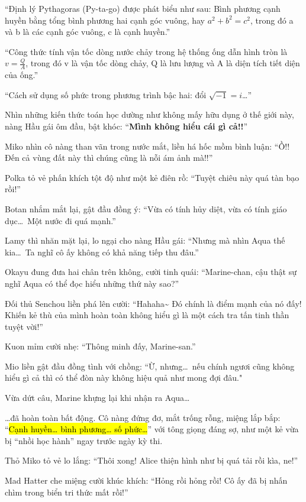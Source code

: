 \documentclass[../main.tex]{subfiles}
\begin{document}
``Định lý Pythagoras (Py-ta-go) được phát biểu như sau: Bình phương cạnh huyền bằng tổng bình phương hai cạnh góc vuông, hay \(a^2 + b^2 = c^2\), trong đó a và b là các cạnh góc vuông, c là cạnh huyền.''

``Công thức tính vận tốc dòng nước chảy trong hệ thống ống dẫn hình tròn là \(v = \frac{Q}{A}\), trong đó v là vận tốc dòng chảy, Q là lưu lượng và A là diện tích tiết diện của ống.''

``Cách sử dụng số phức trong phương trình bậc hai: đổi \(\sqrt{-1} = i \)\dots''

Nhìn những kiến thức toán học dường như không mấy hữu dụng ở thế giới này, nàng Hầu gái ôm đầu, bật khóc: ``\textbf{Mình không hiểu cái gì cả!!}''

Miko nhìn cô nàng than vãn trong nước mắt, liền há hốc mồm bình luận: ``Ồ!! Đến cả vùng đất này thì chúng cũng là nỗi ám ảnh mà!!''

Polka tỏ vẻ phấn khích tột độ như một kẻ điên rồ: ``Tuyệt chiêu này quá tàn bạo rồi!''

Botan nhắm mắt lại, gật đầu đồng ý: ``Vừa có tính hủy diệt, vừa có tính giáo dục\dots\ Một nước đi quá mạnh.''

Lamy thì nhăn mặt lại, lo ngại cho nàng Hầu gái: ``Nhưng mà nhìn Aqua thế kia\dots\ Ta nghĩ cô ấy không có khả năng tiếp thu đâu.''

Okayu đung đưa hai chân trên không, cười tinh quái: ``Marine-chan, cậu thật sự nghĩ Aqua có thể đọc hiểu những thứ này sao?''

Đối thủ Senchou liền phá lên cười: ``Hahaha\~{} Đó chính là điểm mạnh của nó đấy! Khiến kẻ thù của mình hoàn toàn không hiểu gì là một cách tra tấn tinh thần tuyệt vời!''

Kuon mỉm cười nhẹ: ``Thông minh đấy, Marine-san.''

Mio liền gật đầu đồng tình với chồng: ``Ừ, nhưng\dots\ nếu chính ngươi cũng không hiểu gì cả thì có thể đòn này không hiệu quả như mong đợi đâu."

Vừa dứt câu, Marine khựng lại khi nhận ra Aqua\dots

\dots đã hoàn toàn bất động. Cô nàng đứng đơ, mắt trống rỗng, miệng lắp bắp: ``\hl{Cạnh huyền\dots{} bình phương\dots{} số phức\dots}'' với tông giọng đáng sợ, như một kẻ vừa bị ``nhồi học hành'' ngay trước ngày kỳ thi.

Thỏ Miko tỏ vẻ lo lắng: ``Thôi xong! Alice thiện hình như bị quá tải rồi kìa, ne!''

Mad Hatter che miệng cười khúc khích: ``Hỏng rồi hỏng rồi! Cô ấy đã bị nhấn chìm trong biển tri thức mất rồi!''
\end{document}
